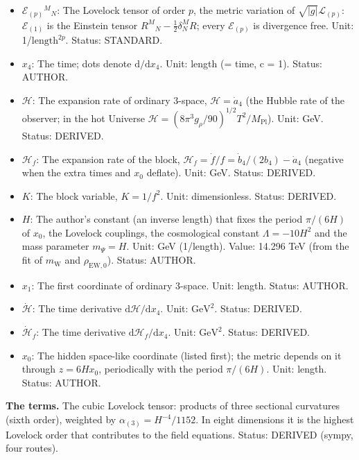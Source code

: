 \documentclass[
  10pt,
]{article}
\providecommand{\tightlist}{%
  \setlength{\itemsep}{0pt}\setlength{\parskip}{0pt}}
\begin{document}
\begin{itemize}
\tightlist
\item
  \(\mathcal{E}_{(p)}{}^M{}_N\): The Lovelock tensor of order \(p\), the
  metric variation of \(\sqrt{\lvert g\rvert}\mathcal{L}_{(p)}\):
  \(\mathcal{E}_{(1)}\) is the Einstein tensor
  \(R^M{}_N - \frac12\delta^M_NR\); every \(\mathcal{E}_{(p)}\) is
  divergence free. Unit: 1/\(\mathrm{length}^{2p}\). Status: STANDARD.
\item
  \(x_4\): The time; dots denote \(\mathrm{d}/\mathrm{d}x_4\). Unit:
  length (= time, c = 1). Status: AUTHOR.
\item
  \(\mathcal{H}\): The expansion rate of ordinary 3-space,
  \(\mathcal{H} = \dot a_4\) (the Hubble rate of the observer; in the
  hot Universe
  \(\mathcal{H} = (8\pi^3g_\rho/90)^{1/2}T^2/M_{\mathrm{Pl}}\)). Unit:
  GeV. Status: DERIVED.
\item
  \(\mathcal{H}_f\): The expansion rate of the block,
  \(\mathcal{H}_f = \dot f/f = \dot b_4/(2b_4) - \dot a_4\) (negative
  when the extra times and \(x_0\) deflate). Unit: GeV. Status: DERIVED.
\item
  \(K\): The block variable, \(K = 1/f^2\). Unit: dimensionless. Status:
  DERIVED.
\item
  \(H\): The author's constant (an inverse length) that fixes the period
  \(\pi/(6H)\) of \(x_0\), the Lovelock couplings, the cosmological
  constant \(\Lambda = -10H^2\) and the mass parameter \(m_\Psi = H\).
  Unit: GeV (1/length). Value: 14.296 TeV (from the fit of
  \(m_{\mathrm{W}}\) and \(\rho_{\mathrm{EW},0}\)). Status: AUTHOR.
\item
  \(x_1\): The first coordinate of ordinary 3-space. Unit: length.
  Status: AUTHOR.
\item
  \(\dot{\mathcal{H}}\): The time derivative
  \(\mathrm{d}\mathcal{H}/\mathrm{d}x_4\). Unit: \(\mathrm{GeV}^{2}\).
  Status: DERIVED.
\item
  \(\dot{\mathcal{H}}_f\): The time derivative
  \(\mathrm{d}\mathcal{H}_f/\mathrm{d}x_4\). Unit: \(\mathrm{GeV}^{2}\).
  Status: DERIVED.
\item
  \(x_0\): The hidden space-like coordinate (listed first); the metric
  depends on it through \(z = 6Hx_0\), periodically with the period
  \(\pi/(6H)\). Unit: length. Status: AUTHOR.
\end{itemize}

\textbf{The terms.} The cubic Lovelock tensor: products of three
sectional curvatures (sixth order), weighted by
\(\alpha_{(3)} = H^{-4}/1152\). In eight dimensions it is the highest
Lovelock order that contributes to the field equations. Status: DERIVED
(sympy, four routes).
\end{document}
